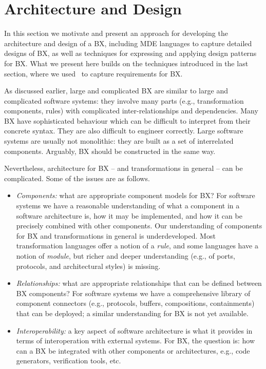 \section{Architecture and Design}
\label{section:architecture-and-design}

In this section we motivate and present an approach for developing the architecture and design of a BX, including MDE languages to capture detailed designs of BX, as well as techniques for expressing and applying design patterns for BX. What we present here builds on the techniques introduced in the last section, where we used \transml\ to capture requirements for BX.

As discussed earlier, large and complicated BX are similar to large and complicated software systems: they involve many parts (e.g., transformation components, rules) with complicated inter-relationships and dependencies. Many BX have sophisticated behaviour which can be difficult to interpret from their concrete syntax. They are also difficult to engineer correctly. Large software systems are usually not monolithic: they are built as a set of interrelated components. Arguably, BX should be constructed in the same way. 

Nevertheless, architecture for BX -- and transformations in general -- can be complicated. Some of the issues are as follows.
\begin{itemize}
\item \textit{Components:} what are appropriate component models for BX? For software systems we have a reasonable understanding of what a component in a software architecture is, how it may be implemented, and how it can be precisely combined with other components. Our understanding of components for BX and transformations in general is underdeveloped. Most transformation languages offer a notion of a \textit{rule}, and some languages have a notion of \textit{module}, but richer and deeper understanding (e.g., of ports, protocols, and architectural styles) is missing.

\item \textit{Relationships:} what are appropriate relationships that can be defined between BX components? For software systems we have a comprehensive library of component connectors (e.g., protocols, buffers, compositions, containments) that can be deployed; a similar understanding for BX is not yet available.

\item \textit{Interoperability:} a key aspect of software architecture is what it provides in terms of interoperation with external systems. For BX, the question is: how can a BX be integrated with other components or architectures, e.g., code generators, verification tools, etc. 
\end{itemize}

